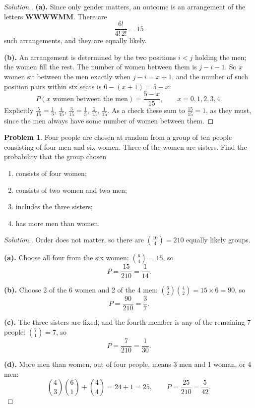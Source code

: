 \documentclass[12pt,a4paper]{report}
\theoremstyle{definition}
\theoremstyle{plain}
\theoremstyle{definition}
\newtheorem{problemx}{Problem}[section]
\newenvironment{problem}{\begin{problemx}}{\end{problemx}}
\newenvironment{solution}
  {\renewcommand{\qedsymbol}{}\begin{proof}[\textit{Solution}.]}
  {\end{proof}}
\begin{document}
\begin{solution}
\textbf{(a).} Since only gender matters, an outcome is an arrangement of the letters
\textbf{WWWWMM}. There are
\[\frac{6!}{4!\,2!} = 15\]
such arrangements, and they are equally likely.

\textbf{(b).} An arrangement is determined by the two positions $i<j$ holding the men;
the women fill the rest. The number of women between them is $j-i-1$. So $x$ women sit
between the men exactly when $j-i = x+1$, and the number of such position pairs within
six seats is $6-(x+1) = 5-x$:
\[P(x\text{ women between the men}) = \frac{5-x}{15}, \qquad x = 0,1,2,3,4.\]
Explicitly $\tfrac{5}{15}=\tfrac13$, $\tfrac{4}{15}$, $\tfrac{3}{15}=\tfrac15$,
$\tfrac{2}{15}$, $\tfrac{1}{15}$. As a check these sum to $\tfrac{15}{15}=1$, as they
must, since the men always have some number of women between them.
\end{solution}

\begin{problem}
Four people are chosen at random from a group of ten people consisting of four men and
six women. Three of the women are sisters. Find the probability that the group chosen
\begin{enumerate}
\item[(a).] consists of four women;
\item[(b).] consists of two women and two men;
\item[(c).] includes the three sisters;
\item[(d).] has more men than women.
\end{enumerate}
\end{problem}

\begin{solution}
Order does not matter, so there are $\binom{10}{4} = 210$ equally likely groups.

\textbf{(a).} Choose all four from the six women: $\binom{6}{4} = 15$, so
\[P = \frac{15}{210} = \frac{1}{14}.\]

\textbf{(b).} Choose 2 of the 6 women and 2 of the 4 men:
$\binom{6}{2}\binom{4}{2} = 15\times 6 = 90$, so
\[P = \frac{90}{210} = \frac{3}{7}.\]

\textbf{(c).} The three sisters are fixed, and the fourth member is any of the remaining
7 people: $\binom{7}{1} = 7$, so
\[P = \frac{7}{210} = \frac{1}{30}.\]

\textbf{(d).} More men than women, out of four people, means 3 men and 1 woman, or 4 men:
\[\binom{4}{3}\binom{6}{1} + \binom{4}{4} = 24 + 1 = 25,
\qquad P = \frac{25}{210} = \frac{5}{42}.\]
\end{solution}
\end{document}
